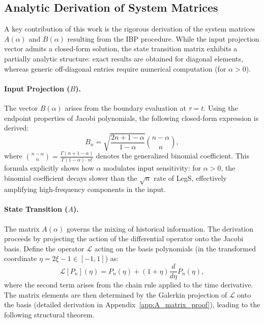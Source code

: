 \documentclass{article}
\theoremstyle{plain}
\theoremstyle{definition}
\theoremstyle{remark}
\begin{document}
\subsection{Analytic Derivation of System Matrices}
\label{subsec:matrices}

A key contribution of this work is the rigorous derivation of the system matrices $A(\alpha)$ and $B(\alpha)$ resulting from the IBP procedure. While the input projection vector admits a closed-form solution, the state transition matrix exhibits a partially analytic structure: exact results are obtained for diagonal elements, whereas generic off-diagonal entries require numerical computation (for $\alpha > 0$).

\paragraph{Input Projection ($B$).}
The vector $B(\alpha)$ arises from the boundary evaluation at $\tau=t$. Using the endpoint properties of Jacobi polynomials, the following closed-form expression is derived:
\begin{equation}
	B_n = \sqrt{\frac{2n+1-\alpha}{1-\alpha}} \binom{n-\alpha}{n},
	\label{eq:B_vector}
\end{equation}
where $\binom{n-\alpha}{n} = \frac{\Gamma(n+1-\alpha)}{\Gamma(1-\alpha) \cdot n!}$ denotes the generalized binomial coefficient. This formula explicitly shows how $\alpha$ modulates input sensitivity: for $\alpha > 0$, the binomial coefficient decays slower than the $\sqrt{n}$ rate of LegS, effectively amplifying high-frequency components in the input.

\paragraph{State Transition ($A$).}
The matrix $A(\alpha)$ governs the mixing of historical information. The derivation proceeds by projecting the action of the differential operator onto the Jacobi basis. Define the operator $\mathcal{L}$ acting on the basis polynomials (in the transformed coordinate $\eta = 2\xi - 1 \in [-1, 1]$) as:
\begin{equation}
	\mathcal{L}[P_n](\eta) = P_n(\eta) + (1+\eta) \frac{d}{d\eta} P_n(\eta),
	\label{eq:diff_operator}
\end{equation}
where the second term arises from the chain rule applied to the time derivative. The matrix elements are then determined by the Galerkin projection of $\mathcal{L}$ onto the basis (detailed derivation in Appendix~\ref{app:A_matrix_proof}), leading to the following structural theorem.
\end{document}

